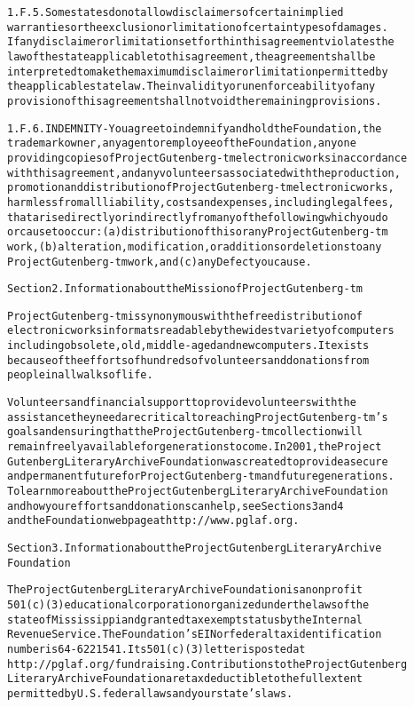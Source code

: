 \documentclass[12pt]{book}[2005/09/16]
\newenvironment{PGtext}{%
\begin{alltt}
\fontsize{8.1}{9}\ttfamily\selectfont}%
{\end{alltt}}
\begin{document}
\begin{PGtext}
1.F.5.  Some states do not allow disclaimers of certain implied
warranties or the exclusion or limitation of certain types of damages.
If any disclaimer or limitation set forth in this agreement violates the
law of the state applicable to this agreement, the agreement shall be
interpreted to make the maximum disclaimer or limitation permitted by
the applicable state law.  The invalidity or unenforceability of any
provision of this agreement shall not void the remaining provisions.

1.F.6.  INDEMNITY - You agree to indemnify and hold the Foundation, the
trademark owner, any agent or employee of the Foundation, anyone
providing copies of Project Gutenberg-tm electronic works in accordance
with this agreement, and any volunteers associated with the production,
promotion and distribution of Project Gutenberg-tm electronic works,
harmless from all liability, costs and expenses, including legal fees,
that arise directly or indirectly from any of the following which you do
or cause to occur: (a) distribution of this or any Project Gutenberg-tm
work, (b) alteration, modification, or additions or deletions to any
Project Gutenberg-tm work, and (c) any Defect you cause.


Section  2.  Information about the Mission of Project Gutenberg-tm

Project Gutenberg-tm is synonymous with the free distribution of
electronic works in formats readable by the widest variety of computers
including obsolete, old, middle-aged and new computers.  It exists
because of the efforts of hundreds of volunteers and donations from
people in all walks of life.

Volunteers and financial support to provide volunteers with the
assistance they need are critical to reaching Project Gutenberg-tm's
goals and ensuring that the Project Gutenberg-tm collection will
remain freely available for generations to come.  In 2001, the Project
Gutenberg Literary Archive Foundation was created to provide a secure
and permanent future for Project Gutenberg-tm and future generations.
To learn more about the Project Gutenberg Literary Archive Foundation
and how your efforts and donations can help, see Sections 3 and 4
and the Foundation web page at http://www.pglaf.org.


Section 3.  Information about the Project Gutenberg Literary Archive
Foundation

The Project Gutenberg Literary Archive Foundation is a non profit
501(c)(3) educational corporation organized under the laws of the
state of Mississippi and granted tax exempt status by the Internal
Revenue Service.  The Foundation's EIN or federal tax identification
number is 64-6221541.  Its 501(c)(3) letter is posted at
http://pglaf.org/fundraising.  Contributions to the Project Gutenberg
Literary Archive Foundation are tax deductible to the full extent
permitted by U.S. federal laws and your state's laws.


\end{PGtext}
\end{document}

